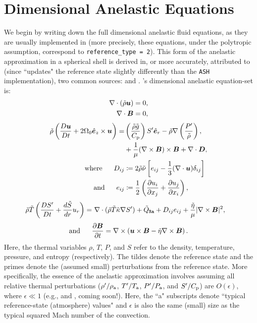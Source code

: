 \documentclass[12pt]{article}
\numberwithin{equation}{section}
\newcommand{\tmpa}{T_{\rm a}}
\newcommand{\rhoa}{\rho_{\rm a}}
\newcommand{\prsa}{P_{\rm a}}
\begin{document}
	\section{Dimensional Anelastic Equations}\label{sec:eqdim}
	We begin by writing down the full dimensional anelastic fluid equations, as they are usually implemented in {\rayleigh} (more precisely, these equations, under the polytropic assumption, correspond to \texttt{reference\_type = 2}). This form of the anelastic approximation in a spherical shell is derived in, or more accurately, attributed to (since {\rayleigh} ``updates" the reference state slightly differently than the \texttt{ASH} implementation), two common sources: \citet{Gilman1981} and \citet{Clune1999}. {\rayleigh}'s dimensional anelastic equation-set is:
	\begin{align}
		\nabla\cdot(\tilde{\rho}\bm{u}) &= 0\label{eq:contdim},\\
		\nabla\cdot \bm{B} &= 0,
	\end{align}
	\begin{subequations}\label{eq:momdim}
	\begin{align}
		\tilde{\rho}\left(\frac{D\bm{u}}{Dt}+2\Omega_0\hat{\bm{e}}_z\times\bm{u}\right) = &  \left(\frac{\tilde{\rho} \tilde{g}}{C_{\rm{p}}}\right) {S^\prime}\hat{\bm{e}}_r-\tilde{\rho}\nabla\left( \frac{{P^\prime}}{\tilde{\rho}} \right), \nonumber\\
		&+ \frac{1}{\mu}(\nabla\times\bm{B})\times\bm{B}+\nabla\cdot\bm{D},\\
		\text{where}\ \ \ \ \  D_{ij} &\coloneqq 2\tilde{\rho}\tilde{\nu} \left[e_{ij} - \frac{1}{3}(\nabla\cdot\bm{u}) \delta_{ij} \right]\label{eq:dstressdim}\\
		\text{and}\ \ \ \ \  e_{ij} &\coloneqq \frac{1}{2}\left(\frac{\partial u_i}{\partial x_j} + \frac{\partial u_j}{\partial x_i} \right),\label{eq:estressdim}
	\end{align}
	\end{subequations}
	\begin{align}\label{eq:endim}
		\tilde{\rho}\tilde{T} \left(\frac{D{S^\prime}}{Dt} + \frac{d\tilde{S}}{dr} u_r\right) = &\ \nabla\cdot(\tilde{\rho} \tilde{T} \tilde{\kappa} \nabla {S^\prime}) +\tilde{Q}_{\texttt{Ra}}+ D_{ij}e_{ij} + \frac{\tilde{\eta}}{\mu}|\nabla\times\bm{B}|^2,
	\end{align}
	\begin{align}\label{eq:inddim}
	\text{and}\ \ \ \ \  \frac{\partial\bm{B}}{\partial t} = \nabla\times\left(\bm{u}\times\bm{B} - \tilde{\eta}\nabla\times\bm{B}\right).
	\end{align}
	Here, the thermal variables $\rho$, $T$, $P$, and $S$ refer to the density, temperature, pressure, and entropy (respectively). The tildes denote the reference state and the primes denote the (assumed small) perturbations from the reference state. More specifically, the essence of the anelastic approximation involves assuming all relative thermal perturbations ($\rhoprime/\rhoa$, $\tmpprime/\tmpa$, $\prsprime/\prsa$, and ${S^\prime}/C_{\rm{p}}$) are $O(\epsilon)$, where $\epsilon\ll1$ (e.g., \citealt{Ogura1962,Gough1969} and \citealt{Matilsky2024b}, coming soon!). Here, the ``a" subscripts denote ``typical reference-state (atmosphere) values" and $\epsilon$ is also the same (small) size as the typical squared Mach number of the convection.
	
\end{document}
